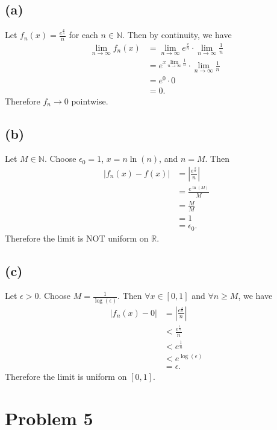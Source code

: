 \documentclass{article}
\newcommand{\R}{\mathbb{R}} %
\newcommand{\N}{\mathbb{N}} %
\begin{document}
\subsection{(a)}
Let $f_n(x) = \frac{e^{\frac{x}{n}}}{n}$ for each $n \in \N$. Then by continuity, we have
\begin{align}
	\lim\limits_{n \to \infty} f_n(x) &= \lim\limits_{n \to \infty} e^{\frac{x}{n}} \cdot \lim\limits_{n \to \infty} \frac{1}{n} \\
	&= e^{x \lim\limits_{n \to \infty}\frac{1}{n}} \cdot \lim\limits_{n \to \infty} \frac{1}{n} \\
	&= e^0 \cdot 0 \\
	&= 0.
\end{align}
Therefore $f_n \to 0$ pointwise.

\subsection*{(b)}
Let $M \in \N$. Choose $\epsilon_0 = 1$, $x = n \ln(n)$, and $n = M$. Then
\begin{align}
	|f_n(x) - f(x)| &= \left|\frac{e^{\frac{x}{n}}}{n}\right| \\
	&= \frac{e^{\ln(M)}}{M} \\
	&= \frac{M}{M} \\
	&= 1 \\
	&= \epsilon_0.
\end{align}
Therefore the limit is NOT uniform on $\R$.

\subsection*{(c)}
Let $\epsilon > 0$. Choose $M = \frac{1}{\log(\epsilon)}$. Then $\forall x \in [0, 1]$ and $\forall n \geq M$, we have
\begin{align}
	|f_n(x) - 0| &= \left|\frac{e^\frac{x}{n}}{n}\right| \\
	&< \frac{e^\frac{1}{n}}{n} \\
	&< e^\frac{1}{n} \\
	&< e^{\log(\epsilon)} \\
	&= \epsilon.
\end{align}
Therefore the limit is uniform on $[0, 1]$.
\section*{Problem 5}
\end{document}
